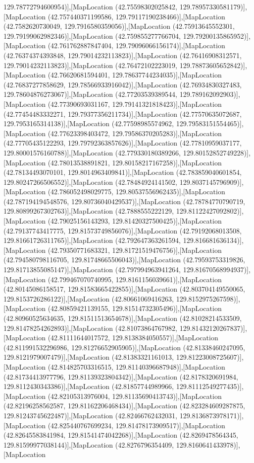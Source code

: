 129.78772794600954)],[MapLocation (42.75598302025842, 129.78957330581179)],[MapLocation (42.757440371199586, 129.79117190238466)],[MapLocation (42.7582620730049, 129.7916580359056)],[MapLocation (42.75913645552301, 129.79199062982346)],[MapLocation (42.759855277766704, 129.79200135865952)],[MapLocation (42.761762887847404, 129.79096066156174)],[MapLocation (42.76374374393848, 129.79014232113823)],[MapLocation (42.76416908312571, 129.79014232113823)],[MapLocation (42.76472102223019, 129.78873605652842)],[MapLocation (42.76620681594401, 129.78637744234035)],[MapLocation (42.76837277858629, 129.78566933916042)],[MapLocation (42.76934830327483, 129.78604876273067)],[MapLocation (42.77203539389544, 129.789162092903)],[MapLocation (42.77390693031167, 129.79141321818423)],[MapLocation (42.77454483332271, 129.79377356211734)],[MapLocation (42.77570635072687, 129.7953165314138)],[MapLocation (42.77598985574962, 129.79583151554465)],[MapLocation (42.77623398403472, 129.79586370205283)],[MapLocation (42.77705435122293, 129.79792363857626)],[MapLocation (42.77810959037177, 129.80001576160788)],[MapLocation (42.779330180389266, 129.80152852749228)],[MapLocation (42.78013538891821, 129.80158217167258)],[MapLocation (42.78134493070101, 129.8014963409841)],[MapLocation (42.783859040601854, 129.80247266506552)],[MapLocation (42.78484924141502, 129.8037145796909)],[MapLocation (42.786052498029775, 129.80537556962435)],[MapLocation (42.787194194548576, 129.80736040429537)],[MapLocation (42.78784770790719, 129.80899267302763)],[MapLocation (42.7888555222129, 129.81122427092802)],[MapLocation (42.79025156143293, 129.81420327500425)],[MapLocation (42.79137743417775, 129.81573749856076)],[MapLocation (42.79192068013508, 129.81661726311765)],[MapLocation (42.792647363261594, 129.816681636134)],[MapLocation (42.79350771683321, 129.81721519476756)],[MapLocation (42.794580798116705, 129.81748665506043)],[MapLocation (42.79593753319826, 129.81713855085147)],[MapLocation (42.797994963941264, 129.81670568994937)],[MapLocation (42.799467070740995, 129.8161156039661)],[MapLocation (42.80145086158517, 129.81583665422855)],[MapLocation (42.803704149550065, 129.8153726286122)],[MapLocation (42.80661069416263, 129.8152975267598)],[MapLocation (42.80859421139155, 129.81514732305496)],[MapLocation (42.80960525634635, 129.81511513654678)],[MapLocation (42.81028214533509, 129.81478254262893)],[MapLocation (42.81073864767982, 129.81432120267837)],[MapLocation (42.81111644017572, 129.8138384050557)],[MapLocation (42.811991532296986, 129.81276652905905)],[MapLocation (42.81338460247095, 129.8121979007479)],[MapLocation (42.81383321161013, 129.81223008725607)],[MapLocation (42.814825703316515, 129.81140396687948)],[MapLocation (42.81734413977796, 129.81139323804342)],[MapLocation (42.8178320691984, 129.8112430343386)],[MapLocation (42.81857744989966, 129.81112549277435)],[MapLocation (42.82105313976004, 129.81135690413743)],[MapLocation (42.82196258562587, 129.81162206468434)],[MapLocation (42.823284609287875, 129.81243745622487)],[MapLocation (42.82466762432031, 129.8136873978171)],[MapLocation (42.825440767699234, 129.81478173909517)],[MapLocation (42.82645583841984, 129.81541474042268)],[MapLocation (42.8269478564345, 129.81599977038144)],[MapLocation (42.8276796354409, 129.8160641433978)],[MapLocation 